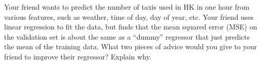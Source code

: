 Your friend wants to predict the number of taxis used in HK in one hour from various features, such as weather, time of day, day of year, etc. Your friend uses linear regression to fit the data, but finds that the mean squared error (MSE) on the validation set is about the same as a “dummy” regressor that just predicts the mean of the training data. What two pieces of advice would you give to your friend to improve their regressor? Explain why.
